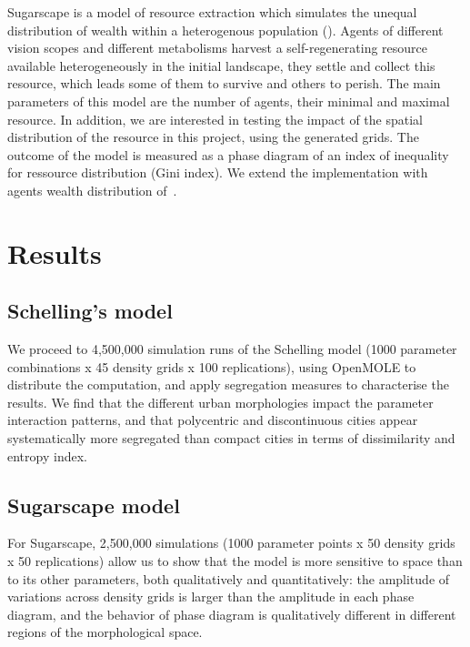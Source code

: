 \documentclass[Afour,sageh,times]{sagej}
\begin{document}
Sugarscape is a model of resource extraction which simulates the unequal distribution of wealth within a heterogenous population (\cite{EpsteinAxtell1996}). Agents of different vision scopes and different metabolisms harvest a self-regenerating resource available heterogeneously in the initial landscape, they settle and collect this resource, which leads some of them to survive and others to perish. The main parameters of this model are the number of agents, their minimal and maximal resource. In addition, we are interested in testing the impact of the spatial distribution of the resource in this project, using the generated grids. The outcome of the model is measured as a phase diagram of an index of inequality for ressource distribution (Gini index). We extend the implementation with agents wealth distribution of~\cite{li2009netlogo}.


\section{Results}




\subsection{Schelling's model}

We proceed to 4,500,000 simulation runs of the Schelling model (1000 parameter combinations x 45 density grids x 100 replications), using OpenMOLE to distribute the computation, and apply segregation measures to characterise the results. We find that the different urban morphologies impact the parameter interaction patterns, and that polycentric and discontinuous cities appear systematically more segregated than compact cities in terms of dissimilarity and entropy index.



\subsection{Sugarscape model}

For Sugarscape, 2,500,000 simulations (1000 parameter points x 50 density grids x 50 replications) allow us to show that the model is more sensitive to space than to its other parameters, both qualitatively and quantitatively: the amplitude of variations across density grids is larger than the amplitude in each phase diagram, and the behavior of phase diagram is qualitatively different in different regions of the morphological space.
\end{document}
